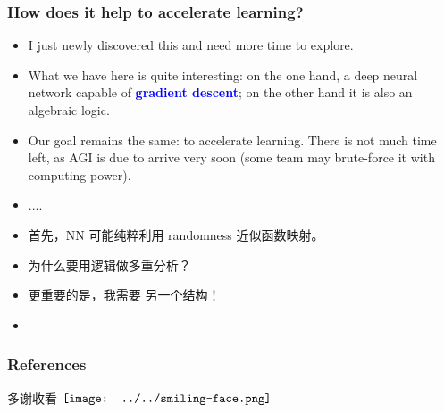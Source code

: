 \documentclass[16pt]{beamer}
\newcommand{\cc}[2]{#1}
\newcommand{\cc}[2]{#2}
\let\oldtextbf\textbf
\renewcommand{\textbf}[1]{\textcolor{blue}{\oldtextbf{#1}}}
\newcommand{\smiley}{$\vcenter{\hbox{\texttt{[image: ../../smiling-face.png]}}}$}
\begin{document}
\begin{frame}
\frametitle{How does it help to accelerate learning?}
\begin{itemize}
	\item I just newly discovered this and need more time to explore.
	
	\item What we have here is quite interesting: on the one hand, a deep neural network capable of \textbf{gradient descent};  on the other hand it is also an algebraic logic.
	
	\item Our goal remains the same: to accelerate learning.  There is not much time left, as AGI is due to arrive very soon (some team may brute-force it with computing power).

	\item ....
	\item 首先，NN 可能纯粹利用 randomness 近似函数映射。
	\item 为什么要用逻辑做多重分析？
	\item 更重要的是，我需要 另一个结构！
	\item 
\end{itemize}
\end{frame}

\begin{frame}
\frametitle{References}
\cc{多谢收看}{Thanks for watching} \smiley \vspace{1cm}
\printbibliography
\end{frame}
\end{document}
